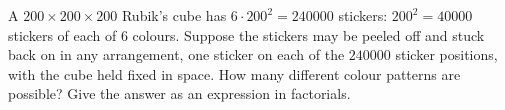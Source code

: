 A $200\times200\times200$ Rubik's cube has $6\cdot200^2=240000$ stickers: $200^2=40000$ stickers of each of $6$ colours. Suppose the stickers may be peeled off and stuck back on in any arrangement, one sticker on each of the $240000$ sticker positions, with the cube held fixed in space. How many different colour patterns are possible? Give the answer as an expression in factorials.

